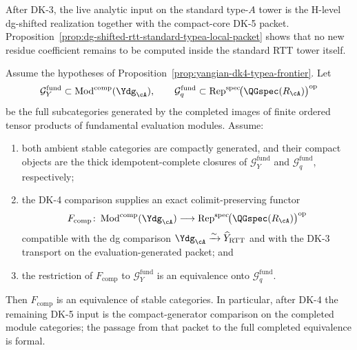 \begin{remark}
After DK-3, the live analytic input on the standard type-$A$ tower is
the H-level dg-shifted realization together with the compact-core
DK-5 packet. Proposition~\ref{prop:dg-shifted-rtt-standard-typea-local-packet}
shows that no new residue coefficient remains to be computed inside
the standard RTT tower itself.
\end{remark}

\begin{proposition}
\label{prop:yangian-dk5-compact-generators}
Assume the hypotheses of
Proposition~\ref{prop:yangian-dk4-typea-frontier}. Let
\[
\mathcal{G}^{\mathrm{fund}}_{Y}
\subset \operatorname{Mod}^{\mathrm{comp}}(\Ydg_{\cA}),
\qquad
\mathcal{G}^{\mathrm{fund}}_{q}
\subset \operatorname{Rep}^{\mathrm{spec}}\!
 \bigl(\QGspec(R_{\cA})\bigr)^{\mathrm{op}}
\]
be the full subcategories generated by the completed images of finite
ordered tensor products of fundamental evaluation modules. Assume:
\begin{enumerate}[label=\textup{(\roman*)}]
\item both ambient stable categories are compactly generated, and
 their compact objects are the thick idempotent-complete closures of
 $\mathcal{G}^{\mathrm{fund}}_{Y}$ and
 $\mathcal{G}^{\mathrm{fund}}_{q}$, respectively;
\item the DK-4 comparison supplies an exact colimit-preserving functor
 \[
 F_{\mathrm{comp}}\colon
 \operatorname{Mod}^{\mathrm{comp}}(\Ydg_{\cA})
 \longrightarrow
 \operatorname{Rep}^{\mathrm{spec}}\!
 \bigl(\QGspec(R_{\cA})\bigr)^{\mathrm{op}}
 \]
 compatible with the dg comparison
 $\Ydg_{\cA}\xrightarrow{\sim}\widehat Y_{\mathrm{RTT}}$ and with the
 DK-3 transport on the evaluation-generated packet; and
\item the restriction of $F_{\mathrm{comp}}$ to
 $\mathcal{G}^{\mathrm{fund}}_{Y}$ is an equivalence onto
 $\mathcal{G}^{\mathrm{fund}}_{q}$.
\end{enumerate}
Then $F_{\mathrm{comp}}$ is an equivalence of stable categories. In
particular, after DK-4 the remaining DK-5 input is the compact-generator
comparison on the completed module categories; the passage from that
packet to the full completed equivalence is formal.
\end{proposition}

